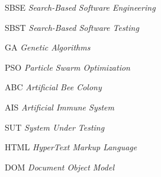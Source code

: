 \begin{siglas}
  \item[SBSE] \textit{Search-Based Software Engineering}
  \item[SBST] \textit{Search-Based Software Testing}
  \item[GA] \textit{Genetic Algorithms}
  \item[PSO] \textit{Particle Swarm Optimization}
  \item[ABC] \textit{Artificial Bee Colony}
  \item[AIS] \textit{Artificial Immune System}
  \item[SUT] \textit{System Under Testing}
  \item[HTML] \textit{HyperText Markup Language}
  \item[DOM]  \textit{Document Object Model}
\end{siglas}
